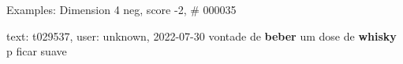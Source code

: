 \begin{frame}{Examples: Dimension 4 neg, score -2, \# 000035}
\footnotesize
\begin{alertblock}{text: t029537, user: unknown, 2022-07-30}
vontade de \textbf{beber} um dose de \textbf{whisky} p ficar suave 
\end{alertblock}
\end{frame}

